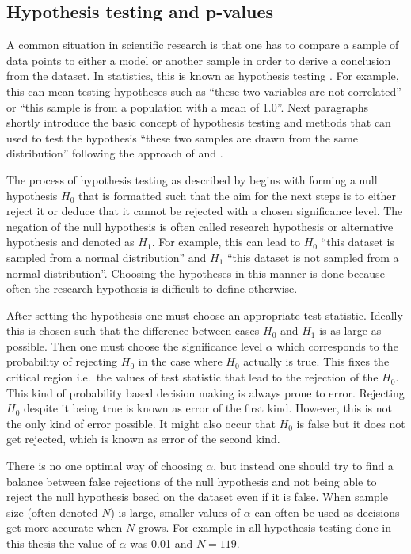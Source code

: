\documentclass[english, twoside]{HYgradu}
\begin{document}
\subsection{Hypothesis testing and p-values}
A common situation in scientific research is that one has to compare a sample of data points to either a model or another sample in order to derive a conclusion from the dataset. In statistics, this is known as hypothesis testing \citep{wall2003practical}. For example, this can mean testing hypotheses such as ``these two variables are not correlated'' or ``this sample is from a population with a mean of 1.0''. Next paragraphs shortly introduce the basic concept of hypothesis testing and methods that can used to test the hypothesis ``these two samples are drawn from the same distribution'' following the approach of \citet{bohm2010introduction} and \citet{wall2003practical}.

The process of hypothesis testing as described by \citet{bohm2010introduction} begins with forming a null hypothesis $H_0$ that is formatted such that the aim for the next steps is to either reject it or deduce that it cannot be rejected with a chosen significance level. The negation of the null hypothesis is often called research hypothesis or alternative hypothesis and denoted as $H_1$. For example, this can lead to $H_0$ ``this dataset is sampled from a normal distribution'' and $H_1$ ``this dataset is not sampled from a normal distribution''. Choosing the hypotheses in this manner is done because often the research hypothesis is difficult to define otherwise.

After setting the hypothesis one must choose an appropriate test statistic. Ideally this is chosen such that the difference between cases $H_0$ and $H_1$ is as large as possible. Then one must choose 
the significance level $\alpha$ which corresponds to the probability of rejecting $H_0$ in the case where $H_0$ actually is true. This fixes the critical region i.e.\ the values of test statistic that lead to the rejection of the $H_0$. This kind of probability based decision making is always prone to error. Rejecting $H_0$ despite it being true is known as error of the first kind. However, this is not the only kind of error possible. It might also occur that $H_0$ is false but it does not get rejected, which is known as error of the second kind.

There is no one optimal way of choosing $\alpha$, but instead one should try to find a balance between false rejections of the null hypothesis and not being able to reject the null hypothesis based on the dataset even if it is false. When sample size (often denoted $N$) is large, smaller values of $\alpha$ can often be used as decisions get more accurate when $N$ grows. For example in all hypothesis testing done in this thesis the value of $\alpha$ was 0.01 and $N=119$.
\end{document}
